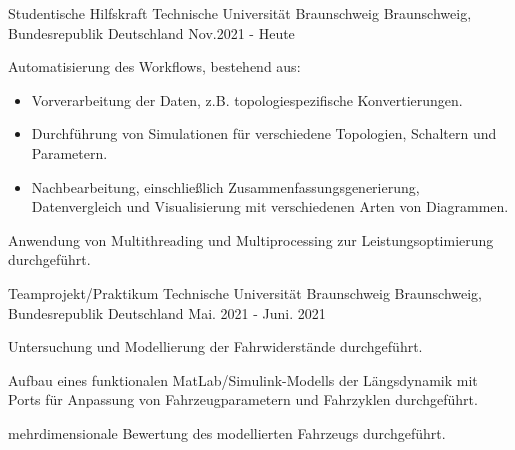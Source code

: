

\begin{cventries}

  \cventry
  {Studentische Hilfskraft} %
  {Technische Universität Braunschweig} %
  {Braunschweig, Bundesrepublik Deutschland} %
  {Nov.2021 - Heute} %
  {
    \begin{cvitems} %
      \item {Automatisierung des Workflows, bestehend aus:
                  \begin{itemize}
                    \item Vorverarbeitung der Daten, z.B. topologiespezifische Konvertierungen.
                    \item Durchführung von Simulationen für verschiedene Topologien, Schaltern und Parametern.
                    \item Nachbearbeitung, einschließlich Zusammenfassungsgenerierung, Datenvergleich und Visualisierung mit verschiedenen Arten von Diagrammen.
                  \end{itemize}}
      \item {Anwendung von Multithreading und Multiprocessing zur Leistungsoptimierung durchgeführt.}
    \end{cvitems}
  }

  \cventry
  {Teamprojekt/Praktikum} %
  {Technische Universität Braunschweig} %
  {Braunschweig, Bundesrepublik Deutschland} %
  {Mai. 2021 - Juni. 2021} %
  {
    \begin{cvitems} %
      \item {Untersuchung und Modellierung der Fahrwiderstände durchgeführt.}
      \item {Aufbau eines funktionalen MatLab/Simulink-Modells der Längsdynamik mit Ports für Anpassung von Fahrzeugparametern und Fahrzyklen durchgeführt.}
      \item {mehrdimensionale Bewertung des modellierten Fahrzeugs durchgeführt.}
    \end{cvitems}
  }


\end{cventries}
